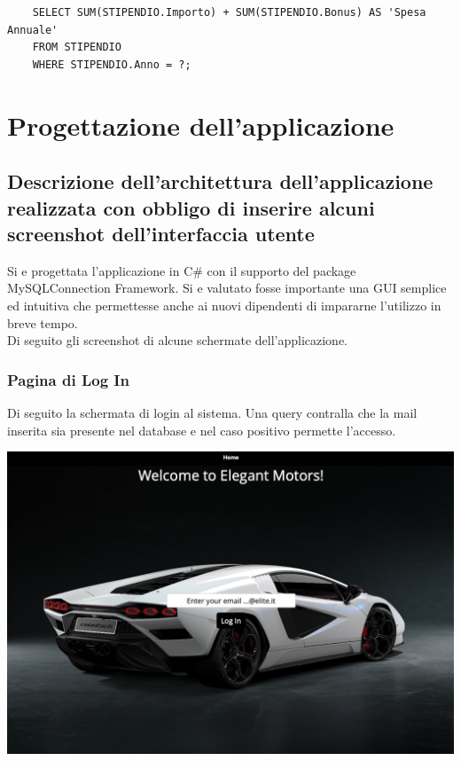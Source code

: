 \documentclass[11pt]{article}
\begin{document}
\begin{lstlisting}
    SELECT SUM(STIPENDIO.Importo) + SUM(STIPENDIO.Bonus) AS 'Spesa Annuale'
    FROM STIPENDIO
    WHERE STIPENDIO.Anno = ?;
\end{lstlisting}

\section{Progettazione dell'applicazione}

\subsection{Descrizione dell'architettura dell'applicazione realizzata con
obbligo di inserire alcuni screenshot dell'interfaccia utente}

Si e progettata l'applicazione in C\# con il supporto del package
MySQLConnection Framework. Si e valutato fosse importante una GUI semplice ed
intuitiva che permettesse anche ai nuovi dipendenti di impararne l'utilizzo in
breve tempo.\\
Di seguito gli screenshot di alcune schermate dell'applicazione.

\subsubsection{Pagina di Log In}
Di seguito la schermata di login al sistema. Una query contralla che la mail
inserita sia presente nel database e nel caso positivo permette l'accesso.
\begin{center}
    \includegraphics[width=\linewidth]{images/app/logInPage.png}
\end{center}
\end{document}
